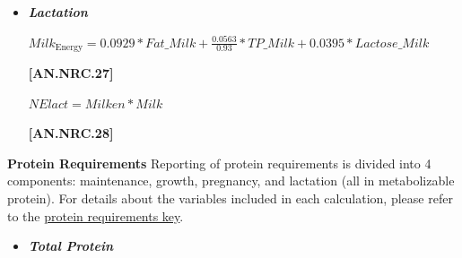 \documentclass{article}
\begin{document}
\begin{refsection}
\begin{itemize}
\textit{\small Otherwise}

\vspace{0.5cm}
            {\raggedleft \textbf{[AN.NRC.25]}\par}
\vspace{0.2cm}

\begin{center}
    \(NEpreg = MEpreg * 0.664\)
\end{center}

\vspace{0.5cm}
            {\raggedleft \textbf{[AN.NRC.26]}\par}

\vspace{0.5cm}



        \item \textbf{\textit{Lactation}}
\vspace{0.2cm}

\begin{center}
    \(Milk_{\text{Energy}} = 0.0929 * Fat\_Milk + \frac{0.0563}{0.93} * TP\_Milk + 0.0395 * Lactose\_Milk\)
\end{center}

\vspace{0.5cm}
            {\raggedleft \textbf{[AN.NRC.27]}\par}

\vspace{0.2cm}

\begin{center}
    \(NElact = Milken * Milk\)
\end{center}

\vspace{0.5cm}
            {\raggedleft \textbf{[AN.NRC.28]}\par}
            
\vspace{0.5cm}


    \end{itemize}

    
    \textbf{ Protein Requirements} Reporting of protein requirements is divided into 4 components: maintenance, growth, pregnancy, and lactation (all in metabolizable protein). For details about the variables included in each calculation, please refer to the \hyperref[proteinkey]{protein requirements key}.
    \vspace{0.2cm}

    \begin{itemize}
                \item \textbf{\textit{Total Protein}}
\vspace{0.2cm}


\end{itemize}
\end{refsection}
\end{document}
